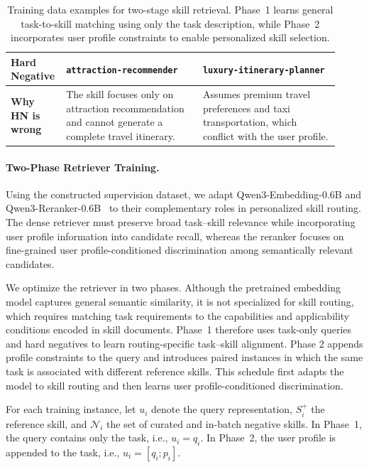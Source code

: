 \documentclass[letterpaper]{article} %
\begin{document}
\begin{table}[t]
\begin{tabular}{p{0.12\linewidth} p{0.40\linewidth} p{0.40\linewidth}}
\midrule

\textbf{Hard Negative} &
\texttt{attraction-recommender} 
&
\texttt{luxury-itinerary-planner} 

\\

\midrule

\textbf{Why HN is wrong} &
The skill focuses only on attraction recommendation and cannot generate a complete travel itinerary.
&
Assumes premium travel preferences and taxi transportation, which conflict with the user profile.
\\

\bottomrule
\end{tabular}
\caption{Training data examples for two-stage skill retrieval. Phase~1 learns general task-to-skill matching using only the task description, while Phase~2 incorporates user profile constraints to enable personalized skill selection.}
\label{tab:training_examples_persona}
\end{table}

\paragraph{Two-Phase Retriever Training.}
Using the constructed supervision dataset, we adapt Qwen3-Embedding-0.6B and Qwen3-Reranker-0.6B~\cite{qwen3embedding} to their complementary roles in personalized skill routing. The dense retriever must preserve broad task--skill relevance while incorporating user profile information into candidate recall, whereas the reranker focuses on fine-grained user profile-conditioned discrimination among semantically relevant candidates.



We optimize the retriever in two phases. Although the pretrained embedding model captures general semantic similarity, it is not specialized for skill routing, which requires matching task requirements to the capabilities and applicability conditions encoded in skill documents. Phase~1 therefore uses task-only queries and hard negatives to learn routing-specific task--skill alignment. Phase 2 appends profile constraints to the query and introduces paired instances in which the same task is associated with different reference skills. This schedule first adapts the model to skill routing and then learns user profile-conditioned discrimination.

For each training instance, let $u_i$ denote the query representation,
$S_i^{+}$ the reference skill, and $\mathcal{N}_i$ the set of curated
and in-batch negative skills. In Phase~1, the query contains only the task,
i.e., $u_i=q_i$. In Phase~2, the user profile is appended to the task,
i.e., $u_i=[q_i;p_i]$.
\end{document}
